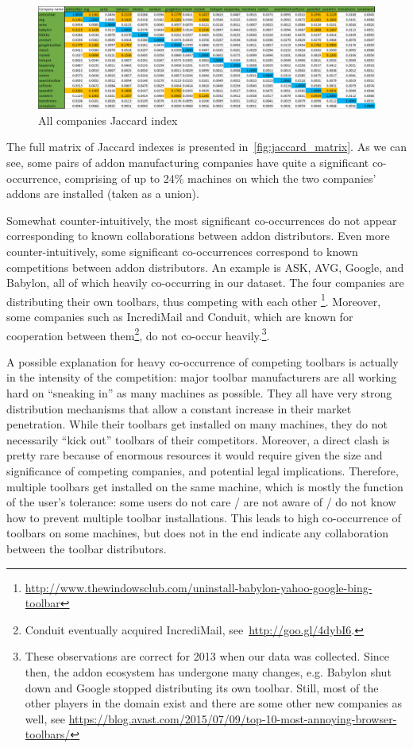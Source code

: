 \documentclass[ijoc,nonblindrev]{informs3} %
\numberwithin{equation}{subsection}
\begin{document}
\begin{figure}[!htbp]
\centering
\includegraphics[width=\linewidth]{figures/JaccardMatrix.png}
\caption{All companies Jaccard index}
\label{fig:jaccard_matrix}
\end{figure}

The full matrix of Jaccard indexes is presented in~\autoref{fig:jaccard_matrix}. As we can see, some pairs of addon manufacturing companies have quite a significant co-occurrence, comprising of up to 24\% machines on which the two companies' addons are installed (taken as a union). 

Somewhat counter-intuitively, the most significant co-occurrences do not appear corresponding to known collaborations between addon distributors. Even more counter-intuitively, some significant co-occurrences correspond to known competitions between addon distributors. An example is ASK, AVG, Google, and Babylon, all of which heavily co-occurring in our dataset. The four companies are distributing their own toolbars, thus competing with each other \footnote{\url{http://www.thewindowsclub.com/uninstall-babylon-yahoo-google-bing-toolbar}}. Moreover, some companies such as IncrediMail and Conduit, which are known for cooperation between them\footnote{Conduit eventually acquired IncrediMail, see~\url{http://goo.gl/4dybI6}.}, do not co-occur heavily.\footnote{These observations are correct for 2013 when our data was collected. Since then, the addon ecosystem has undergone many changes, e.g. Babylon shut down and Google stopped distributing its own toolbar. Still, most of the other players in the domain exist and there are some other new companies as well, see \url{https://blog.avast.com/2015/07/09/top-10-most-annoying-browser-toolbars/}}.

A possible explanation for heavy co-occurrence of competing toolbars is actually in the intensity of the competition: major toolbar manufacturers are all working hard on ``sneaking in'' as many machines as possible. They all have very strong distribution mechanisms that allow a constant increase in their market penetration. While their toolbars get installed on many machines, they do not necessarily ``kick out'' toolbars of their competitors. Moreover, a direct clash is pretty rare because of enormous resources it would require given the size and significance of competing companies, and potential legal implications. Therefore, multiple toolbars get installed on the same machine, which is mostly the function of the user's tolerance: some users do not care / are not aware of / do not know how to prevent multiple toolbar installations. This leads to high co-occurrence of toolbars on some machines, but does not in the end indicate any collaboration between the toolbar distributors.
\end{document}
